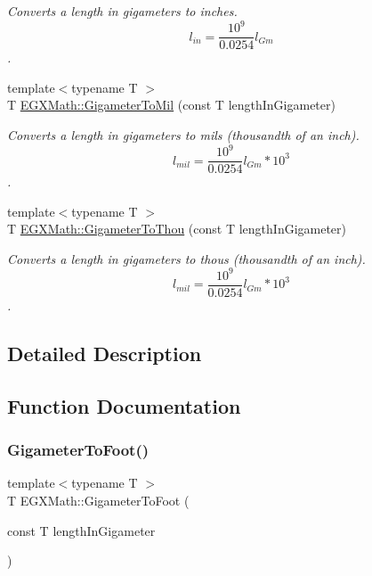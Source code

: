 \begin{DoxyCompactItemize}
\begin{DoxyCompactList}\small\item\em Converts a length in gigameters to inches. \[ l_{in}= \frac{10^{9}}{0.0254} l_{Gm} \]. \end{DoxyCompactList}\item 
{\footnotesize template$<$typename T $>$ }\\T \mbox{\hyperlink{group___e_g_x_math-_conversions-_length_conversions-_s_i-_gigameter-_imperial_ga498a43d44c0c0f6527362688d6cc361f}{E\+G\+X\+Math\+::\+Gigameter\+To\+Mil}} (const T length\+In\+Gigameter)
\begin{DoxyCompactList}\small\item\em Converts a length in gigameters to mils (thousandth of an inch). \[ l_{mil}= \frac{10^{9}}{0.0254} l_{Gm} * 10^{3} \]. \end{DoxyCompactList}\item 
{\footnotesize template$<$typename T $>$ }\\T \mbox{\hyperlink{group___e_g_x_math-_conversions-_length_conversions-_s_i-_gigameter-_imperial_ga94fd906264f882396dc438a684e22b41}{E\+G\+X\+Math\+::\+Gigameter\+To\+Thou}} (const T length\+In\+Gigameter)
\begin{DoxyCompactList}\small\item\em Converts a length in gigameters to thous (thousandth of an inch). \[ l_{mil}= \frac{10^{9}}{0.0254} l_{Gm} * 10^{3} \]. \end{DoxyCompactList}\end{DoxyCompactItemize}


\subsection{Detailed Description}


\subsection{Function Documentation}
\mbox{\label{group___e_g_x_math-_conversions-_length_conversions-_s_i-_gigameter-_imperial_gaeabf3c29bcb3076a8b41986debbf046b}} 
\subsubsection{\texorpdfstring{Gigameter\+To\+Foot()}{GigameterToFoot()}}
{\footnotesize\ttfamily template$<$typename T $>$ \\
T E\+G\+X\+Math\+::\+Gigameter\+To\+Foot (\begin{DoxyParamCaption}\item[{const T}]{length\+In\+Gigameter }\end{DoxyParamCaption})}



